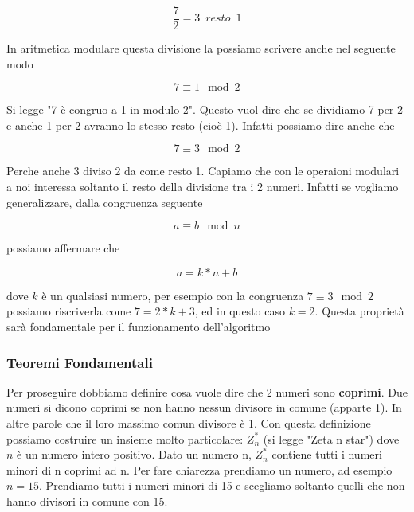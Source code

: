 \documentclass{rapport}
\begin{document}
\begin{equation*}
    \frac{7}{2} = 3 \,\,\, resto \,\,\,  1
\end{equation*}

In aritmetica modulare questa divisione la possiamo scrivere anche nel seguente modo

\begin{equation*}
    7 \equiv 1 \mod 2
\end{equation*}

Si legge "7 è congruo a 1 in modulo 2". Questo vuol dire che se dividiamo 7 per 2 e anche 1 per 2 avranno lo stesso resto (cioè 1). Infatti possiamo dire anche che

\begin{equation*}
    7 \equiv 3 \mod 2
\end{equation*}


Perche anche 3 diviso 2 da come resto 1. Capiamo che con le operaioni modulari a noi interessa soltanto il resto della divisione tra i 2 numeri. Infatti se vogliamo generalizzare, dalla congruenza seguente

\begin{equation*}
    a \equiv b \mod n
\end{equation*}

possiamo affermare che 

\begin{equation}\label{eq:1}
    a = k * n + b
\end{equation}

dove $k$ è un qualsiasi numero, per esempio con la congruenza $ 7 \equiv 3 \mod 2$ possiamo riscriverla come $7 = 2*k + 3$, ed in questo caso $k=2$. Questa proprietà sarà fondamentale per il funzionamento dell'algoritmo

\newpage
\subsubsection{Teoremi Fondamentali}
Per proseguire dobbiamo definire cosa vuole dire che 2 numeri sono \textbf{coprimi}. Due numeri si dicono coprimi se non hanno nessun divisore in comune (apparte 1). In altre parole che il loro massimo comun divisore è 1. Con questa definizione possiamo costruire un insieme molto particolare: $Z_n^*$ (si legge "Zeta n star") dove $n$ è un numero intero positivo. Dato un numero n,   $Z_n^*$ contiene tutti i numeri minori di n coprimi ad n. Per fare chiarezza prendiamo un numero, ad esempio $n=15$. Prendiamo tutti i numeri minori di 15 e scegliamo soltanto quelli che non hanno divisori in comune con 15.
\end{document}

